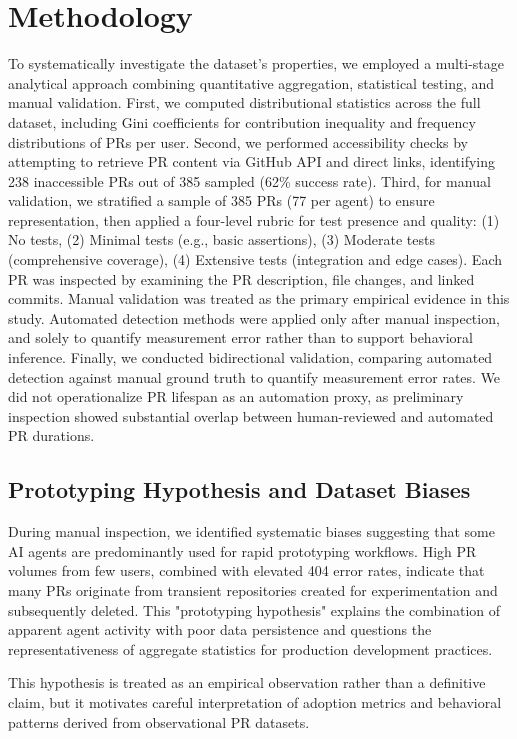 \documentclass[conference]{IEEEtran}
\begin{document}
\section{Methodology}
To systematically investigate the dataset's properties, we employed a multi-stage analytical approach combining quantitative aggregation, statistical testing, and manual validation. First, we computed distributional statistics across the full dataset, including Gini coefficients for contribution inequality and frequency distributions of PRs per user. Second, we performed accessibility checks by attempting to retrieve PR content via GitHub API and direct links, identifying 238 inaccessible PRs out of 385 sampled (62\% success rate). Third, for manual validation, we stratified a sample of 385 PRs (77 per agent) to ensure representation, then applied a four-level rubric for test presence and quality: (1) No tests, (2) Minimal tests (e.g., basic assertions), (3) Moderate tests (comprehensive coverage), (4) Extensive tests (integration and edge cases). Each PR was inspected by examining the PR description, file changes, and linked commits. Manual validation was treated as the primary empirical evidence in this study. Automated detection methods were applied only after manual inspection, and solely to quantify measurement error rather than to support behavioral inference. Finally, we conducted bidirectional validation, comparing automated detection against manual ground truth to quantify measurement error rates. We did not operationalize PR lifespan as an automation proxy, as preliminary inspection showed substantial overlap between human-reviewed and automated PR durations.

\subsection{Prototyping Hypothesis and Dataset Biases}

During manual inspection, we identified systematic biases suggesting that some AI agents are predominantly used for rapid prototyping workflows. High PR volumes from few users, combined with elevated 404 error rates, indicate that many PRs originate from transient repositories created for experimentation and subsequently deleted. This "prototyping hypothesis" explains the combination of apparent agent activity with poor data persistence and questions the representativeness of aggregate statistics for production development practices.

This hypothesis is treated as an empirical observation rather than a definitive claim, but it motivates careful interpretation of adoption metrics and behavioral patterns derived from observational PR datasets.
\end{document}
